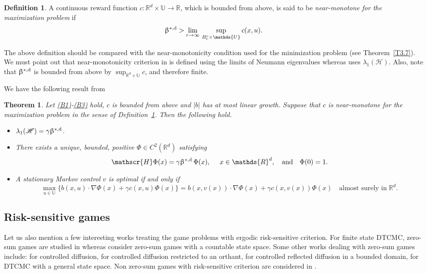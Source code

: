 \documentclass[notitlepage,11pt,reqno]{amsart}
\numberwithin{equation}{section}
\theoremstyle{plain}
\newtheorem{theorem}{Theorem}[section]
\theoremstyle{definition}
\newtheorem{definition}{Definition}[section]
\theoremstyle{remark}
\newcommand{\Act}{{\mathds{U}}}
\newcommand{\sH}{{\mathscr{H}}}
\newcommand{\RR}{\mathds{R}} %
\newcommand{\Rd}{{\mathds{R}^{d}}}
\newcommand{\abs}[1]{\lvert#1\rvert}
\newcommand{\grad}{\nabla}
\begin{document}
\begin{definition}\label{D5.1}
A continuous reward function $c:\Rd\times\Act\to\RR$, which is bounded from above, is said to be {\it near-monotone for the maximization problem}
if
$$\upbeta^{*,{\rm d}}> \lim_{r\to\infty} \, \sup_{B^c_r\times\Act} c(x,u).$$
\end{definition}
The above definition should be compared with the near-monotonicity 
condition used for the minimization problem (see Theorem~\ref{T3.7}).
We must point out that near-monotonicity criterion in \cite{MR4188837} is defined using the limits of Neumann eigenvalues whereas \cite{AB2022} uses 
$\lambda_1(\sH)$. Also, note that $\upbeta^{*,{\rm d}}$ is bounded from above by
$\sup_{\Rd\times\Act} c$, and therefore finite.

We have the following result from \cite[Theorem~4.1]{MR4284521}
\begin{theorem}\label{T5.2}
Let \hyperlink{B1}{(B1)}-\hyperlink{B3}{(B3)} hold, $c$ is bounded from above and $\abs{b}$ has at most linear growth. Suppose that $c$ is near-monotone for the maximization problem in the
sense of Definition~\ref{D5.1}. Then the following hold.
\begin{itemize}
\item[(i)] $\lambda_1(\sH)=\gamma \upbeta^{*,{\rm d}}$.
\item[(ii)] There exists a unique, bounded, positive $\Phi\in C^2(\Rd)$ satisfying
$$\sH\Phi(x)=\gamma\upbeta^{*,{\rm d}}\,\Phi(x), \quad \
 x\in\Rd, \quad \text{and}\quad \Phi(0)=1.$$
\item[(iii)] A stationary Markov control $v$ is optimal if and only if
$$\max_{u\in\Act}\{b(x, u)\cdot \grad \Phi(x) + \gamma c(x, u)\Phi(x)\}= b(x, v(x))\cdot \grad \Phi(x) + \gamma c(x, v(x))\Phi(x)\quad \text{almost surely in}\; \Rd.$$
\end{itemize}
\end{theorem}




\subsection{Risk-sensitive games}
Let us also mention a few interesting works treating the game problems with ergodic risk-sensitive criterion. For finite state DTCMC, zero-sum games
are studied in \cite{MR3900793} whereas \cite{MR3131320,GGPP22a} consider zero-sum games with a countable state space. Some other works dealing with
zero-sum games include: \cite{MR4058410} for controlled diffusion, \cite{MR4185068} for controlled diffusion restricted to an orthant, \cite{MR4310348} for 
controlled reflected diffusion in a bounded domain, \cite{MR3583765} for DTCMC with a general state space. Non zero-sum games with risk-sensitive 
criterion are considered in \cite{MR4330327,MR3801104,MR4396400,MR4436615,GGPP22b,GKPP22}.
\end{document}
